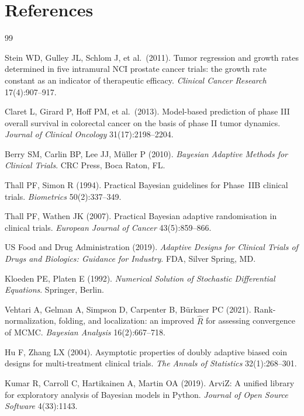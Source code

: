 \documentclass[11pt,a4paper]{article}
\begin{document}
\section*{References}
 
\begin{thebibliography}{99}
 
Stein WD, Gulley JL, Schlom J, et al.\ (2011).
Tumor regression and growth rates determined in five intramural NCI prostate
cancer trials: the growth rate constant as an indicator of therapeutic efficacy.
\textit{Clinical Cancer Research} 17(4):907--917.
 
Claret L, Girard P, Hoff PM, et al.\ (2013).
Model-based prediction of phase III overall survival in colorectal cancer on
the basis of phase II tumor dynamics.
\textit{Journal of Clinical Oncology} 31(17):2198--2204.
 
Berry SM, Carlin BP, Lee JJ, Müller P (2010).
\textit{Bayesian Adaptive Methods for Clinical Trials}.
CRC Press, Boca Raton, FL.
 
Thall PF, Simon R (1994).
Practical Bayesian guidelines for Phase~IIB clinical trials.
\textit{Biometrics} 50(2):337--349.
 
Thall PF, Wathen JK (2007).
Practical Bayesian adaptive randomisation in clinical trials.
\textit{European Journal of Cancer} 43(5):859--866.
 
US Food and Drug Administration (2019).
\textit{Adaptive Designs for Clinical Trials of Drugs and Biologics:
Guidance for Industry}.
FDA, Silver Spring, MD.
 
Kloeden PE, Platen E (1992).
\textit{Numerical Solution of Stochastic Differential Equations}.
Springer, Berlin.
 
Vehtari A, Gelman A, Simpson D, Carpenter B, Bürkner PC (2021).
Rank-normalization, folding, and localization: an improved $\hat{R}$ for
assessing convergence of MCMC.
\textit{Bayesian Analysis} 16(2):667--718.
 
Hu F, Zhang LX (2004).
Asymptotic properties of doubly adaptive biased coin designs for
multi-treatment clinical trials.
\textit{The Annals of Statistics} 32(1):268--301.
 
Kumar R, Carroll C, Hartikainen A, Martin OA (2019).
ArviZ: A unified library for exploratory analysis of Bayesian models in Python.
\textit{Journal of Open Source Software} 4(33):1143.
 
\end{thebibliography}
 
\end{document}
